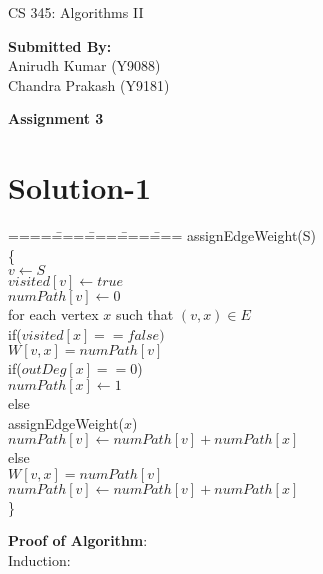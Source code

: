 \documentclass[a4paper,10pt]{article}
\begin{document}
\begin{center}{\Huge CS 345: Algorithms II}\\
\begin{flushright}
\textbf{Submitted By:}\\
Anirudh Kumar (Y9088)\\
Chandra Prakash (Y9181)
\end{flushright}
\LARGE \textbf{Assignment 3}\\
\end{center}
\normalsize
\section{Solution-1}
\begin{tabbing}
====\====\====\====\====\kill
assignEdgeWeight(S)\\
\{\\
\>$v\leftarrow S$\>\\
\>$visited[v]\leftarrow true$\\
\>$numPath[v]\leftarrow  0$\\
\>for each vertex $x$ such that $(v,x)\in E$\\
\>\>if($visited[x]==false)$\\
\>\>\>$W[v,x] = numPath[v]$\\
\>\>\>if($outDeg[x]==0$)\\
\>\>\>\>$numPath[x] \leftarrow 1$\\
\>\>\>else\\
\>\>\>\>assignEdgeWeight($x$)\\
\>\>\>$numPath[v] \leftarrow numPath[v]+numPath[x]$\\
\>\>else\\
\>\>\>$W[v,x] = numPath[v]$\\
\>\>\>$numPath[v] \leftarrow numPath[v]+numPath[x]$\\
\}\\
\end{tabbing}
\textbf{Proof of Algorithm}:\\
Induction:\\
\end{document}
